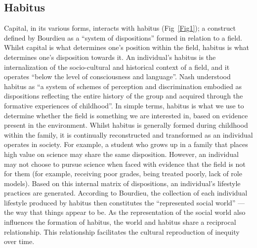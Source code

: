 \subsection*{Habitus}
Capital, in its various forms, interacts with habitus (Fig~\ref{Fig1}); a construct defined by Bourdieu as a ``system of dispositions''\cite{Bourdieu1984} formed in relation to a field. Whilst capital is what determines one's position within the field, habitus is what determines one's disposition towards it.\cite{Bourdieu1992} An individual's habitus is the internalization of the socio-cultural and historical context of a field, and it operates ``below the level of consciousness and language''.\cite{Bourdieu1984} Nash\cite{Nash1999} understood habitus as ``a system of schemes of perception and discrimination embodied as dispositions reflecting the entire history of the group and acquired through the formative experiences of childhood''. In simple terms, habitus is what we use to determine whether the field is something we are interested in, based on evidence present in the environment. Whilst habitus is generally formed during childhood within the family\cite{Dimaggio1982}, it is continually reconstructed and transformed as an individual operates in society. For example, a student who grows up in a family that places high value on science may share the same disposition.\cite{archer2013aspires} However, an individual may not choose to pursue science when faced with evidence that the field is not for them (for example, receiving poor grades, being treated poorly, lack of role models). Based on this internal matrix of dispositions, an individual's lifestyle practices are generated. According to Bourdieu, the collection of each individual lifestyle produced by habitus then constitutes the ``represented social world''\cite{Bourdieu1984} --- the way that things appear to be. As the representation of the social world also influences the formation of habitus, the world and habitus share a reciprocal relationship. This relationship facilitates the cultural reproduction of inequity over time. 

